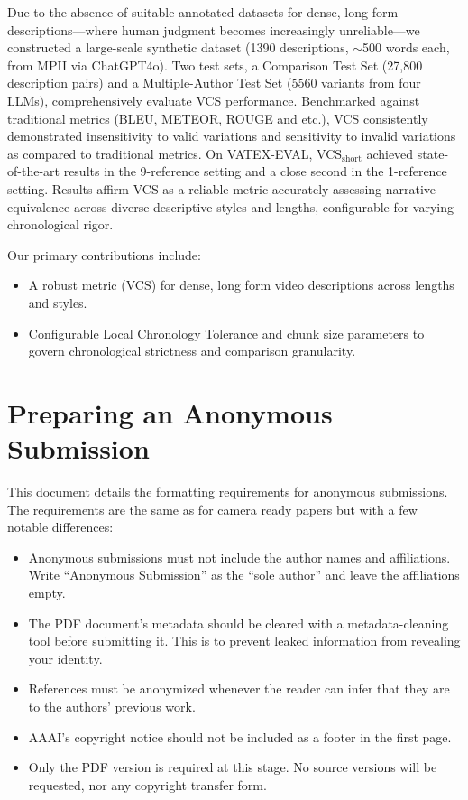 \documentclass[letterpaper]{article} %
\begin{document}
Due to the absence of suitable annotated datasets for dense, long-form descriptions—where human judgment becomes increasingly unreliable—we constructed a large-scale synthetic dataset (1390 descriptions, $\sim$500 words each, from MPII via ChatGPT4o). Two test sets, a Comparison Test Set (27,800 description pairs) and a Multiple-Author Test Set (5560 variants from four LLMs), comprehensively evaluate VCS performance. Benchmarked against traditional metrics (BLEU, METEOR, ROUGE and etc.), VCS consistently demonstrated insensitivity to valid variations and sensitivity to invalid variations as compared to traditional metrics. On VATEX-EVAL, VCS$_{\text{short}}$ achieved state-of-the-art results in the 9-reference setting and a close second in the 1-reference setting. Results affirm VCS as a reliable metric accurately assessing narrative equivalence across diverse descriptive styles and lengths, configurable for varying chronological rigor.

Our primary contributions include:
\begin{itemize}
\item A robust metric (VCS) for dense, long form video descriptions across lengths and styles.
\item Configurable Local Chronology Tolerance and chunk size parameters to govern chronological strictness and comparison granularity.
\end{itemize}

\section{Preparing an Anonymous Submission}

This document details the formatting requirements for anonymous submissions. The requirements are the same as for camera ready papers but with a few notable differences:

\begin{itemize}
    \item Anonymous submissions must not include the author names and affiliations. Write ``Anonymous Submission'' as the ``sole author'' and leave the affiliations empty.
    \item The PDF document's metadata should be cleared with a metadata-cleaning tool before submitting it. This is to prevent leaked information from revealing your identity.
    \item References must be anonymized whenever the reader can infer that they are to the authors' previous work.
    \item AAAI's copyright notice should not be included as a footer in the first page.
    \item Only the PDF version is required at this stage. No source versions will be requested, nor any copyright transfer form.
\end{itemize}
\end{document}
